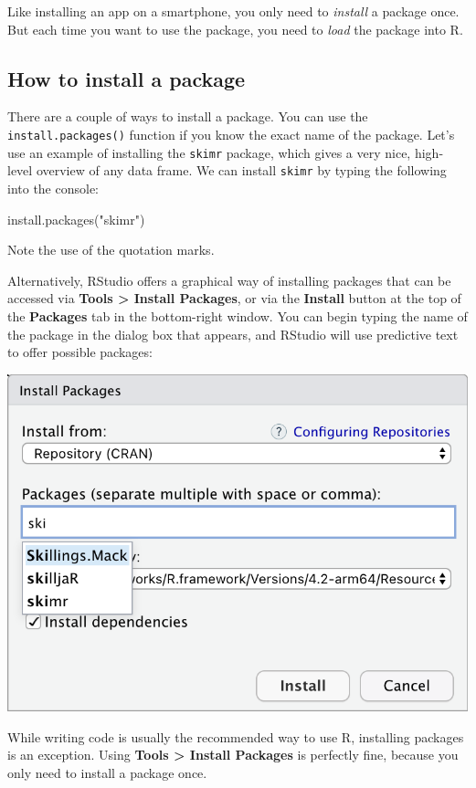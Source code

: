 \documentclass[
]{memoir}
\newenvironment{Shaded}{\begin{snugshade}}{\end{snugshade}}
\newcommand{\FunctionTok}[1]{\textcolor[rgb]{0.00,0.00,0.00}{#1}}
\newcommand{\NormalTok}[1]{#1}
\newcommand{\StringTok}[1]{\textcolor[rgb]{0.31,0.60,0.02}{#1}}
\begin{document}
Like installing an app on a smartphone, you only need to \emph{install} a package once. But each time you want to use the package, you need to \emph{load} the package into R.

\hypertarget{how-to-install-a-package}{%
\subsection{How to install a package}\label{how-to-install-a-package}}

There are a couple of ways to install a package. You can use the \texttt{install.packages()} function if you know the exact name of the package. Let's use an example of installing the \texttt{skimr} package, which gives a very nice, high-level overview of any data frame. We can install \texttt{skimr} by typing the following into the console:

\begin{Shaded}
\begin{Highlighting}[]
\FunctionTok{install.packages}\NormalTok{(}\StringTok{"skimr"}\NormalTok{)}
\end{Highlighting}
\end{Shaded}

Note the use of the quotation marks.

Alternatively, RStudio offers a graphical way of installing packages that can be accessed via \textbf{Tools \textgreater{} Install Packages}, or via the \textbf{Install} button at the top of the \textbf{Packages} tab in the bottom-right window. You can begin typing the name of the package in the dialog box that appears, and RStudio will use predictive text to offer possible packages:

\includegraphics[width=0.6\linewidth]{img/install-packages}

While writing code is usually the recommended way to use R, installing packages is an exception. Using \textbf{Tools \textgreater{} Install Packages} is perfectly fine, because you only need to install a package once.
\end{document}
